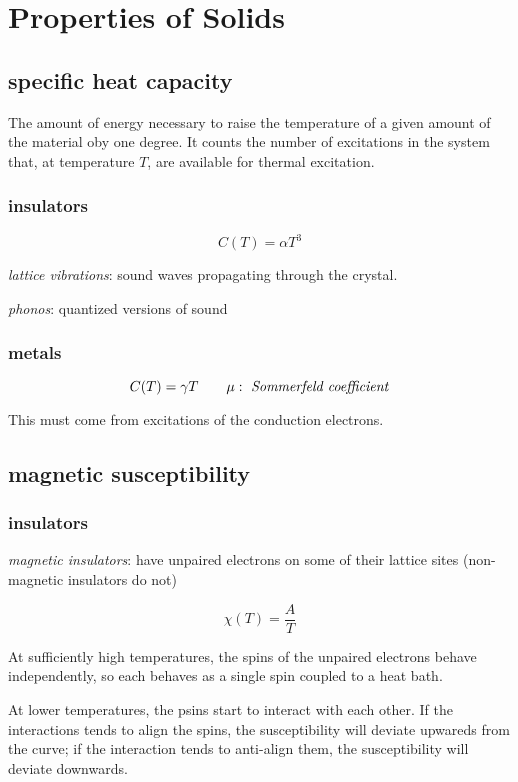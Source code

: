 \documentclass[10pt, a4paper, twocolumn]{article}
\newcommand{\deff}[1]{\par \noindent \textit{#1}: }
\begin{document}
\section{Properties of Solids}

\subsection{specific heat capacity}

The amount of energy necessary to raise the temperature of a given amount of the material oby one degree. It counts the number of excitations in the system that, at temperature $T$, are available for thermal excitation.

\subsubsection{insulators}

\[ C(T) = \alpha T^3 \]

\deff{lattice vibrations}
sound waves propagating through the crystal.
\deff{phonos} quantized versions of sound

\subsubsection{metals}

\[ C(T) = \gamma T \qquad \mu:
\text{ \emph{Sommerfeld coefficient}} \]

This must come from  excitations of the conduction electrons.

\subsection{magnetic susceptibility}

\subsubsection{insulators}

\deff{magnetic insulators} have unpaired electrons on some of their lattice sites (non-magnetic insulators do not)

\[ \chi (T) = \frac{A}{T} \]

At sufficiently high temperatures, the spins of the unpaired electrons behave independently, so each behaves as a single spin coupled to a heat bath.

At lower temperatures, the psins start to interact with each other. If the interactions tends to align the spins, the susceptibility will deviate upwareds from the curve; if the interaction tends to anti-align them, the susceptibility will deviate downwards.
\end{document}

